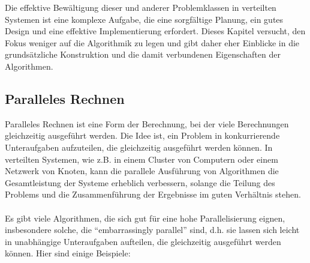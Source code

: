 Die effektive Bewältigung dieser und anderer Problemklassen in verteilten Systemen ist eine komplexe Aufgabe, die eine sorgfältige Planung, ein gutes Design und eine effektive Implementierung erfordert. Dieses Kapitel versucht, den Fokus weniger auf die Algorithmik zu legen und gibt daher eher Einblicke in die grundsätzliche Konstruktion und die damit verbundenen Eigenschaften der Algorithmen.

\subsection{Paralleles Rechnen}

Paralleles Rechnen ist eine Form der Berechnung, bei der viele Berechnungen gleichzeitig ausgeführt werden. Die Idee ist, ein Problem in konkurrierende Unteraufgaben aufzuteilen, die gleichzeitig ausgeführt werden können. In verteilten Systemen, wie z.B. in einem Cluster von Computern oder einem Netzwerk von Knoten, kann die parallele Ausführung von Algorithmen die Gesamtleistung der Systeme erheblich verbessern, solange die Teilung des Problems und die Zusammenführung der Ergebnisse im guten Verhältnis stehen.
\\\\
Es gibt viele Algorithmen, die sich gut für eine hohe Parallelisierung eignen, insbesondere solche, die \enquote{embarrassingly parallel} sind, d.h. sie lassen sich leicht in unabhängige Unteraufgaben aufteilen, die gleichzeitig ausgeführt werden können. Hier sind einige Beispiele:
